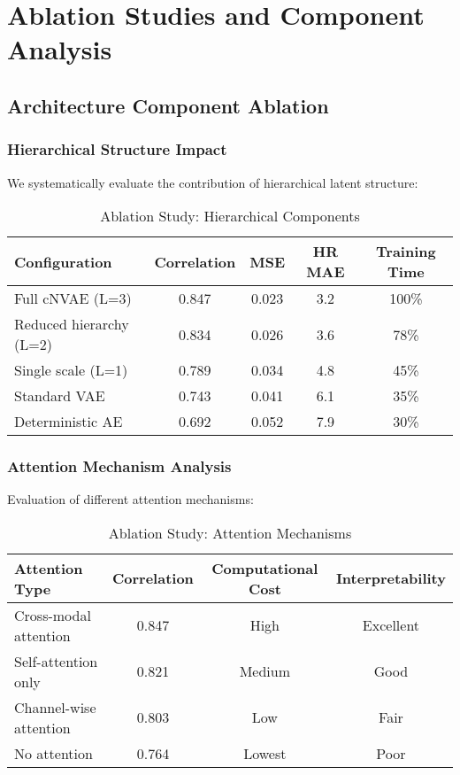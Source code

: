 \documentclass[11pt]{article}
\begin{document}
\section{Ablation Studies and Component Analysis}
\label{sec:ablation}

\subsection{Architecture Component Ablation}

\subsubsection{Hierarchical Structure Impact}
We systematically evaluate the contribution of hierarchical latent structure:

\begin{table}[h]
\centering
\caption{Ablation Study: Hierarchical Components}
\label{tab:ablation_hierarchy}
\begin{tabular}{|l|c|c|c|c|}
\hline
\textbf{Configuration} & \textbf{Correlation} & \textbf{MSE} & \textbf{HR MAE} & \textbf{Training Time} \\
\hline
\hline
Full cNVAE (L=3) & 0.847 & 0.023 & 3.2 & 100\% \\
\hline
Reduced hierarchy (L=2) & 0.834 & 0.026 & 3.6 & 78\% \\
\hline
Single scale (L=1) & 0.789 & 0.034 & 4.8 & 45\% \\
\hline
Standard VAE & 0.743 & 0.041 & 6.1 & 35\% \\
\hline
Deterministic AE & 0.692 & 0.052 & 7.9 & 30\% \\
\hline
\end{tabular}
\end{table}

\subsubsection{Attention Mechanism Analysis}
Evaluation of different attention mechanisms:

\begin{table}[h]
\centering
\caption{Ablation Study: Attention Mechanisms}
\label{tab:ablation_attention}
\begin{tabular}{|l|c|c|c|}
\hline
\textbf{Attention Type} & \textbf{Correlation} & \textbf{Computational Cost} & \textbf{Interpretability} \\
\hline
\hline
Cross-modal attention & 0.847 & High & Excellent \\
\hline
Self-attention only & 0.821 & Medium & Good \\
\hline
Channel-wise attention & 0.803 & Low & Fair \\
\hline
No attention & 0.764 & Lowest & Poor \\
\hline
\end{tabular}
\end{table}
\end{document}
